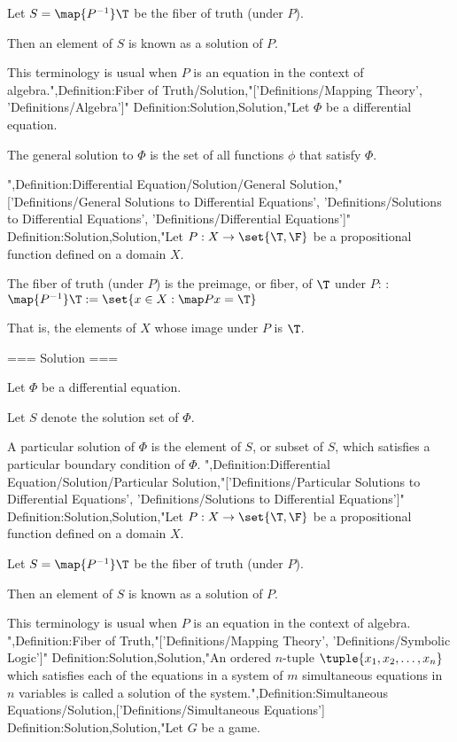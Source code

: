 Let $S = \map {P^{-1} } \T$ be the fiber of truth (under $P$).


Then an element of $S$ is known as a solution of $P$.


This terminology is usual when $P$ is an equation in the context of algebra.",Definition:Fiber of Truth/Solution,"['Definitions/Mapping Theory', 'Definitions/Algebra']"
Definition:Solution,Solution,"Let $\Phi$ be a differential equation.

The general solution to $\Phi$ is the set of all functions $\phi$ that satisfy $\Phi$.



",Definition:Differential Equation/Solution/General Solution,"['Definitions/General Solutions to Differential Equations', 'Definitions/Solutions to Differential Equations', 'Definitions/Differential Equations']"
Definition:Solution,Solution,"Let $P: X \to \set {\T, \F}$ be a propositional function defined on a domain $X$.


The fiber of truth (under $P$) is the preimage, or fiber, of $\T$ under $P$:
:$\map {P^{-1} } \T := \set {x \in X: \map P x = \T}$


That is, the elements of $X$ whose image under $P$ is $\T$.


=== Solution ===

Let $\Phi$ be a differential equation.

Let $S$ denote the solution set of $\Phi$.

A particular solution of $\Phi$ is the element of $S$, or subset of $S$, which satisfies a particular boundary condition of $\Phi$.
",Definition:Differential Equation/Solution/Particular Solution,"['Definitions/Particular Solutions to Differential Equations', 'Definitions/Solutions to Differential Equations']"
Definition:Solution,Solution,"Let $P: X \to \set {\T, \F}$ be a propositional function defined on a domain $X$.

Let $S = \map {P^{-1} } \T$ be the fiber of truth (under $P$).


Then an element of $S$ is known as a solution of $P$.


This terminology is usual when $P$ is an equation in the context of algebra.
",Definition:Fiber of Truth,"['Definitions/Mapping Theory', 'Definitions/Symbolic Logic']"
Definition:Solution,Solution,"An ordered $n$-tuple $\tuple {x_1, x_2, \ldots, x_n}$ which satisfies each of the equations in a system of $m$ simultaneous equations in $n$ variables is called a solution of the system.",Definition:Simultaneous Equations/Solution,['Definitions/Simultaneous Equations']
Definition:Solution,Solution,"Let $G$ be a game.

